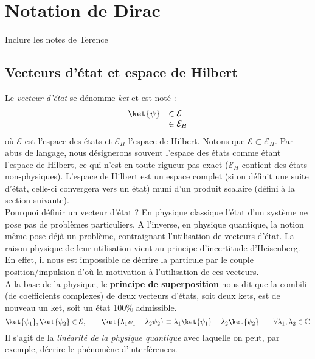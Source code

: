 \chapter{Notation de Dirac}
Inclure les notes de Terence
\section{Vecteurs d'état et espace de Hilbert}
Le \textit{vecteur d'état} se dénomme \textit{ket} et est noté :
\begin{equation}
\begin{array}{ll}
\ket{\psi} & \in \mathcal{E}\\
&\in \mathcal{E}_H
\end{array}
\end{equation}
où $\mathcal{E}$ est l'espace des états et $\mathcal{E}_H$ l'espace de Hilbert. 
Notons que $\mathcal{E} \subset \mathcal{E}_H$. Par abus de langage, nous 
désignerons souvent l'espace des états comme étant l'espace de Hilbert, ce qui 
n'est en toute rigueur pas exact ($\mathcal{E}_H$ contient des états non-physiques).
L'espace de Hilbert est un espace complet (si on définit une suite d'état, celle-ci 
convergera vers un état) muni d'un produit scalaire (défini à la section suivante).\\

Pourquoi définir un vecteur d'état ? En physique classique l'état d'un système 
ne pose pas de problèmes particuliers. A l'inverse, en physique quantique, la notion 
même pose déjà un problème, contraignant l'utilisation de vecteurs d'état. La raison 
physique de leur utilisation vient au principe d'incertitude d'Heisenberg. En effet, 
il nous est impossible de décrire la particule par le couple position/impulsion d'où 
la motivation à l'utilisation de ces vecteurs.\\

A la base de la physique, le \textbf{principe de superposition} nous dit que la 
combili (de coefficients complexes) de deux vecteurs d'états, soit deux kets, est 
de nouveau un ket, soit un état 100\% admissible.
\begin{equation}
\ket{\psi_1}, \ket{\psi_2} \in\mathcal{E},\qquad \ket{\lambda_1\psi_1+\lambda_2\psi_2} 
\equiv \lambda_1\ket{\psi_1}+\lambda_2\ket{\psi_2}\qquad \forall \lambda_1,\lambda_2\in
\mathbb{C}
\end{equation}
Il s'agit de la \textit{linéarité de la physique quantique} avec laquelle on peut, par 
exemple, décrire le phénomène d'interférences.


